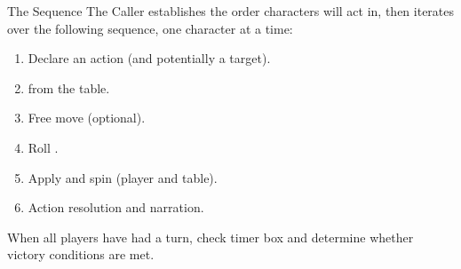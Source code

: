 
\begin{sidebox}{The Sequence}
The Caller establishes the order characters will act in, then iterates over the following sequence, one character at a time:

\begin{enumerate}
\item Declare an action (and potentially a target).
\item \Compels{} from the table.
\item Free move (optional).
\item Roll \dplusskill{}.
\item Apply \Aspects{} and spin (player and table).
\item Action resolution and narration.
\end{enumerate}

When all players have had a turn, check timer box and determine whether victory conditions are met.
\end{sidebox}
